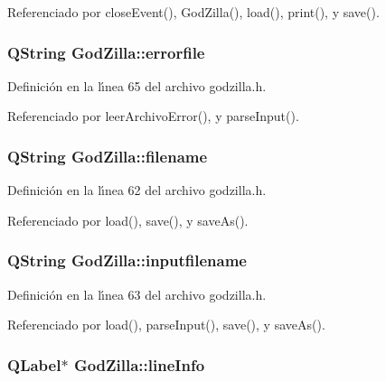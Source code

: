 Referenciado por close\-Event(), God\-Zilla(), load(), print(), y save().
\subsubsection{\setlength{\rightskip}{0pt plus 5cm}QString {\bf God\-Zilla::errorfile}\hspace{0.3cm}{\tt  [private]}}\label{classGodZilla_r5}




Definici\'{o}n en la l\'{\i}nea 65 del archivo godzilla.h.

Referenciado por leer\-Archivo\-Error(), y parse\-Input().
\subsubsection{\setlength{\rightskip}{0pt plus 5cm}QString {\bf God\-Zilla::filename}\hspace{0.3cm}{\tt  [private]}}\label{classGodZilla_r2}




Definici\'{o}n en la l\'{\i}nea 62 del archivo godzilla.h.

Referenciado por load(), save(), y save\-As().
\subsubsection{\setlength{\rightskip}{0pt plus 5cm}QString {\bf God\-Zilla::inputfilename}\hspace{0.3cm}{\tt  [private]}}\label{classGodZilla_r3}




Definici\'{o}n en la l\'{\i}nea 63 del archivo godzilla.h.

Referenciado por load(), parse\-Input(), save(), y save\-As().
\subsubsection{\setlength{\rightskip}{0pt plus 5cm}QLabel$\ast$ {\bf God\-Zilla::line\-Info}\hspace{0.3cm}{\tt  [private]}}\label{classGodZilla_r7}




